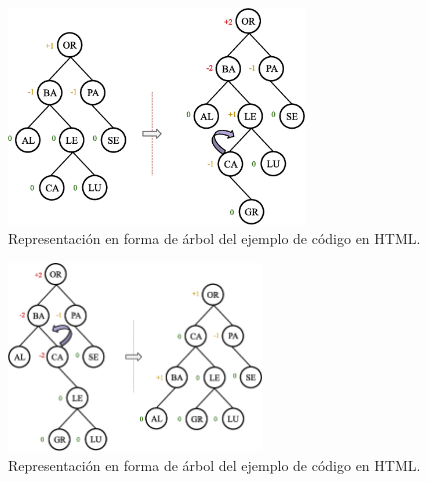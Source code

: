 \begin{figure}[htpb!]
  \begin{center}
    \includegraphics[width=0.7\textwidth]{images/AVLInsertion5.eps}
  \end{center}
  \caption{Representación en forma de árbol del ejemplo de código en HTML.}
  \label{fig:AVLInsertion5}
\end{figure}


\begin{figure}[htpb!]
  \begin{center}
    \includegraphics[width=0.6\textwidth]{images/AVLInsertion6.eps}
  \end{center}
  \caption{Representación en forma de árbol del ejemplo de código en HTML.}
  \label{fig:AVLInsertion6}
\end{figure}

